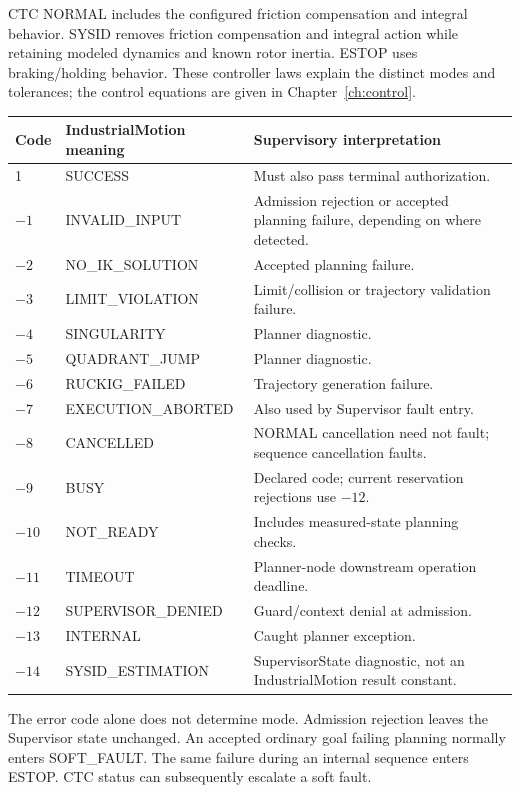 \documentclass[11pt,a4paper]{report}
\begin{document}
CTC NORMAL includes the configured friction compensation and integral behavior. SYSID removes friction compensation and integral action while retaining modeled dynamics and known rotor inertia. ESTOP uses braking/holding behavior. These controller laws explain the distinct modes and tolerances; the control equations are given in Chapter~\ref{ch:control}.

\begin{longtable}{L{.17\linewidth}L{.35\linewidth}L{.41\linewidth}}
\toprule Code & IndustrialMotion meaning & Supervisory interpretation \\\midrule{} & SUCCESS & Must also pass terminal authorization. \\
$-1$ & INVALID\_INPUT & Admission rejection or accepted planning failure, depending on where detected. \\
$-2$ & NO\_IK\_SOLUTION & Accepted planning failure. \\
$-3$ & LIMIT\_VIOLATION & Limit/collision or trajectory validation failure. \\
$-4$ & SINGULARITY & Planner diagnostic. \\
$-5$ & QUADRANT\_JUMP & Planner diagnostic. \\
$-6$ & RUCKIG\_FAILED & Trajectory generation failure. \\
$-7$ & EXECUTION\_ABORTED & Also used by Supervisor fault entry. \\
$-8$ & CANCELLED & NORMAL cancellation need not fault; sequence cancellation faults. \\
$-9$ & BUSY & Declared code; current reservation rejections use $-12$. \\
$-10$ & NOT\_READY & Includes measured-state planning checks. \\
$-11$ & TIMEOUT & Planner-node downstream operation deadline. \\
$-12$ & SUPERVISOR\_DENIED & Guard/context denial at admission. \\
$-13$ & INTERNAL & Caught planner exception. \\
$-14$ & SYSID\_ESTIMATION & SupervisorState diagnostic, not an IndustrialMotion result constant. \\
\bottomrule
\end{longtable}
The error code alone does not determine mode. Admission rejection leaves the Supervisor state unchanged. An accepted ordinary goal failing planning normally enters SOFT\_FAULT. The same failure during an internal sequence enters ESTOP. CTC status can subsequently escalate a soft fault.
\end{document}
